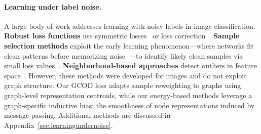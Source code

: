 



\paragraph{Learning under label noise.}
A large body of work addresses learning with noisy labels in image classification. 
\textbf{Robust loss functions} use symmetric losses~\cite{ghosh2017robust} or loss correction~\cite{patrini2017making}. 
\textbf{Sample selection methods} exploit the early learning phenomenon---where networks fit clean patterns before memorizing noise~\cite{arpit2017closer}---to identify likely clean samples via small loss values~\cite{gui2021towards}. 
\textbf{Neighborhood-based approaches} detect outliers in feature space~\cite{zhu2022detecting}.
However, these methods were developed for images and do not exploit graph structure. Our GCOD loss adapts sample reweighting to graphs using graph-level representation centroids, while our energy-based methods leverage a graph-specific inductive bias: the smoothness of node representations induced by message passing.
Additional methods are discussed in Appendix~\ref{sec:learningundernoise}.

